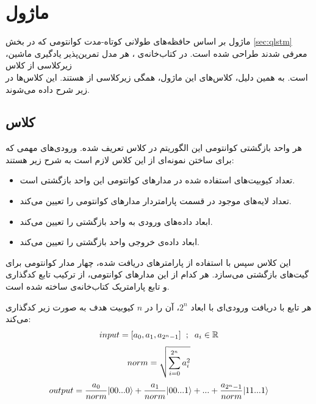 
\section{ماژول
} \label{sec:qlstm_module}
ماژول
بر اساس حافظه‌های طولانی کوتاه-مدت کوانتومی که در بخش
\ref{sec:qlstm}
معرفی شدند طراحی شده است.
در کتاب‌خانه‌ی 
،
هر مدل تمرین‌پذیر یادگیری ماشین، زیرکلاسی از کلاس \\
است. به همین دلیل، کلاس‌های این ماژول، همگی زیرکلاسی از
هستند. این کلاس‌ها در زیر شرح داده می‌شوند.

\subsection{
کلاس
}
هر واحد بازگشتی کوانتومی این الگوریتم در کلاس
تعریف شده.
ورودی‌های مهمی که برای ساختن نمونه‌ای از این کلاس لازم است به شرح زیر هستند:
\begin{itemize}
    \item 
    تعداد کیوبیت‌های استفاده شده در مدارهای کوانتومی این واحد بازگشتی است.
    \item
    تعداد لایه‌های موجود در قسمت پارامتردار مدارهای کوانتومی را تعیین می‌کند.
    \item
    ابعاد داده‌های ورودی به واحد بازگشتی را تعیین می‌کند.
    \item
    ابعاد داده‌ی خروجی واحد بازگشتی را تعیین می‌کند.
\end{itemize}

این کلاس سپس با استفاده از پارامترهای دریافت شده، چهار مدار کوانتومی برای گیت‌های بازگشتی می‌سازد.
هر کدام از این مدارهای کوانتومی، از ترکیب تابع کدگذاری
و تابع پارامتریک
کتاب‌خانه‌ی
ساخته شده است.

هر تابع
با دریافت ورودی‌ای با ابعاد
$2^n$،
آن را در 
$n$
کیوبیت هدف به صورت زیر کدگذاری می‌کند:
\begin{equation} \label{eqn:midi_data}
    \begin{gathered}
       input = [a_0, a_1, a_{2^n-1}] \hspace{2mm} ; \hspace{2mm} a_i \in \mathbb{R} \\[3pt]
       norm = \sqrt{\sum^{2^n}_{i=0} a_i^2 } \\[3pt]
       output = \frac{a_0}{norm} |00...0\rangle + \frac{a_1}{norm} |00...1\rangle + ... + \frac{a_{2^n-1}}{norm} |11...1\rangle
    \end{gathered}
\end{equation}

